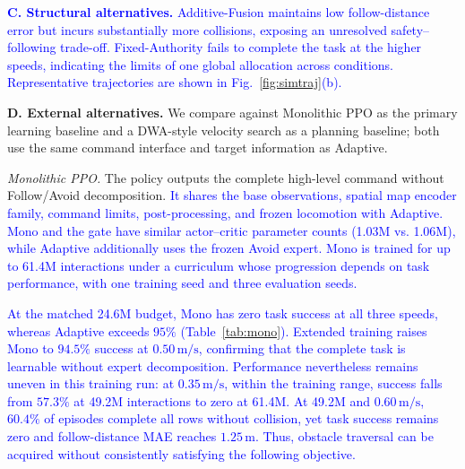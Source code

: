 \documentclass[letterpaper, 10 pt, conference]{ieeeconf}
\newcommand{\msec}{\,\mathrm{m/s}}
\newcommand{\rev}[1]{\textcolor{blue}{#1}}
\begin{document}
\rev{\textbf{C. Structural alternatives.}}
\rev{Additive-Fusion maintains low follow-distance error but incurs substantially more collisions, exposing an unresolved safety--following trade-off. Fixed-Authority fails to complete the task at the higher speeds, indicating the limits of one global allocation across conditions.}
\rev{Representative trajectories are shown in Fig.~\ref{fig:simtraj}(b).}

\textbf{D. External alternatives.}
\label{sec:external}
We compare against Monolithic PPO as the primary learning baseline and a DWA-style velocity search as a planning baseline; both use the same command interface and target information as Adaptive.

\emph{Monolithic PPO.} The policy outputs the complete high-level command without Follow/Avoid decomposition. \rev{It shares the base observations, spatial map encoder family, command limits, post-processing, and frozen locomotion with Adaptive. Mono and the gate have similar actor--critic parameter counts (1.03M vs. 1.06M), while Adaptive additionally uses the frozen Avoid expert. Mono is trained for up to 61.4M interactions under a curriculum whose progression depends on task performance, with one training seed and three evaluation seeds.}

\rev{At the matched 24.6M budget, Mono has zero task success at all three speeds, whereas Adaptive exceeds $95\%$ (Table~\ref{tab:mono}). Extended training raises Mono to $94.5\%$ success at $0.50\msec$, confirming that the complete task is learnable without expert decomposition. Performance nevertheless remains uneven in this training run: at $0.35\msec$, within the training range, success falls from $57.3\%$ at 49.2M interactions to zero at 61.4M. At 49.2M and $0.60\msec$, $60.4\%$ of episodes complete all rows without collision, yet task success remains zero and follow-distance MAE reaches $1.25\,\mathrm{m}$. Thus, obstacle traversal can be acquired without consistently satisfying the following objective.}
\end{document}
